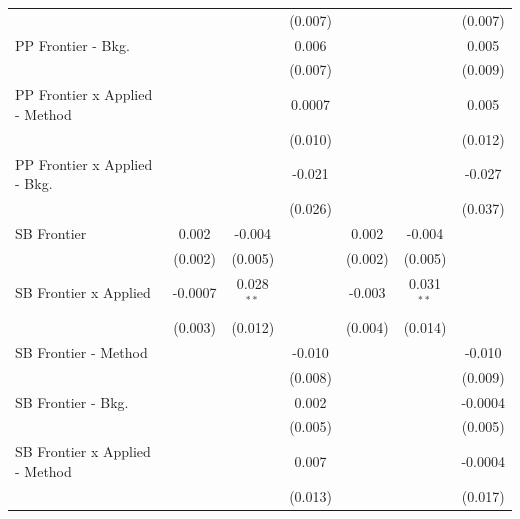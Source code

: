 \begin{tabular}{lcccccc}
                                  &               &              & (0.007)  &                &              & (0.007)\\   
   PP Frontier - Bkg.             &               &              & 0.006    &                &              & 0.005\\   
                                  &               &              & (0.007)  &                &              & (0.009)\\   
   PP Frontier x Applied - Method &               &              & 0.0007   &                &              & 0.005\\   
                                  &               &              & (0.010)  &                &              & (0.012)\\   
   PP Frontier x Applied - Bkg.   &               &              & -0.021   &                &              & -0.027\\   
                                  &               &              & (0.026)  &                &              & (0.037)\\   
   SB Frontier                    & 0.002         & -0.004       &          & 0.002          & -0.004       &   \\   
                                  & (0.002)       & (0.005)      &          & (0.002)        & (0.005)      &   \\   
   SB Frontier x Applied          & -0.0007       & 0.028$^{**}$ &          & -0.003         & 0.031$^{**}$ &   \\   
                                  & (0.003)       & (0.012)      &          & (0.004)        & (0.014)      &   \\   
   SB Frontier - Method           &               &              & -0.010   &                &              & -0.010\\   
                                  &               &              & (0.008)  &                &              & (0.009)\\   
   SB Frontier - Bkg.             &               &              & 0.002    &                &              & -0.0004\\   
                                  &               &              & (0.005)  &                &              & (0.005)\\   
   SB Frontier x Applied - Method &               &              & 0.007    &                &              & -0.0004\\   
                                  &               &              & (0.013)  &                &              & (0.017)\\   

\end{tabular}
